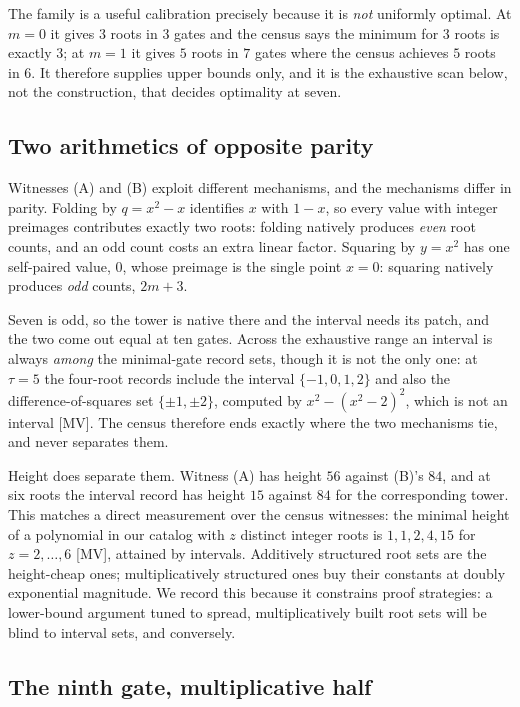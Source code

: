 \documentclass[11pt]{article}
\theoremstyle{definition}
\theoremstyle{remark}
\begin{document}
The family is a useful calibration precisely because it is \emph{not} uniformly
optimal. At $m = 0$ it gives $3$ roots in $3$ gates and the census says the
minimum for $3$ roots is exactly $3$; at $m = 1$ it gives $5$ roots in $7$
gates where the census achieves $5$ roots in $6$. It therefore supplies upper
bounds only, and it is the exhaustive scan below, not the construction, that
decides optimality at seven.

\subsection{Two arithmetics of opposite parity}\label{sec:seven:parity}

Witnesses (A) and (B) exploit different mechanisms, and the mechanisms differ
in parity. Folding by $q = x^2-x$ identifies $x$ with $1-x$, so every value
with integer preimages contributes exactly two roots: folding natively produces
\emph{even} root counts, and an odd count costs an extra linear factor.
Squaring by $y = x^2$ has one self-paired value, $0$, whose preimage is the
single point $x = 0$: squaring natively produces \emph{odd} counts, $2m+3$.

Seven is odd, so the tower is native there and the interval needs its patch,
and the two come out equal at ten gates. Across the exhaustive range an
interval is always \emph{among} the minimal-gate record sets, though it is not
the only one: at $\tau = 5$ the four-root records include the interval
$\{-1,0,1,2\}$ and also the difference-of-squares set $\{\pm1,\pm2\}$, computed
by $x^2 - (x^2-2)^2$, which is not an interval [MV]. The census therefore ends
exactly where the two mechanisms tie, and never separates them.

Height does separate them. Witness (A) has height $56$ against (B)'s $84$, and
at six roots the interval record has height $15$ against $84$ for the
corresponding tower. This matches a direct measurement over the census
witnesses: the minimal height of a polynomial in our catalog with $z$ distinct
integer roots is $1, 1, 2, 4, 15$ for $z = 2,\dots,6$ [MV], attained by
intervals. Additively structured root sets are the height-cheap ones;
multiplicatively structured ones buy their constants at doubly exponential
magnitude. We record this because it constrains proof strategies: a lower-bound
argument tuned to spread, multiplicatively built root sets will be blind to
interval sets, and conversely.

\subsection{The ninth gate, multiplicative half}\label{sec:seven:mult}
\end{document}
